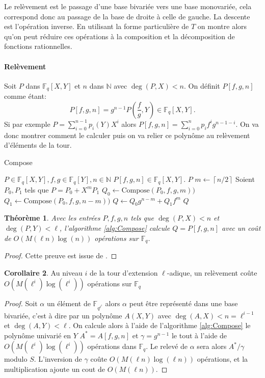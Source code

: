 \documentclass[10pt,a4paper]{book}
\theoremstyle{plain}
\newtheorem{thm}{Théorème}
\theoremstyle{definition}
\theoremstyle{definition}
\newtheorem{cor}[thm]{Corollaire}
\theoremstyle{definition}
\theoremstyle{definition}
\theoremstyle{remark}
\theoremstyle{remark}
\begin{document}
Le relèvement est le passage d'une base bivariée vers une base monovariée, cela correspond donc au passage de la base de droite à celle de gauche. La descente est l'opération inverse. En utilisant la forme particulière de $T$ on montre alors qu'on peut réduire ces opérations à la composition et la décomposition de fonctions rationnelles.

\paragraph{Relèvement}
Soit $P$ dans $\mathbb{F}_q[X,Y]$ et $n$ dans $\mathbb{N}$ avec $\deg(P,X)<n$. On définit $P[f,g,n]$ comme étant:
\[
P[f,g,n]=g^{n-1}P(\frac{f}{g},Y)\in \mathbb{F}_q[X,Y].
\]
Si par exemple $P=\sum_{i=0}^{n-1}p_i(Y)X^i$ alors $P[f,g,n]=\sum_{i=0}^{n}p_if^ig^{n-1-i}$. On va donc montrer comment le calculer puis on va relier ce polynôme au relèvement d'éléments de la tour.

\begin{algorithm}
\caption{\label{alg:Compose}Compose}
\begin{algorithmic}[1]
\REQUIRE $P \in \mathbb{F}_q[X,Y], f,g \in \mathbb{F}_q[Y], n \in \mathbb{N}$
\ENSURE $P[f,g,n] \in \mathbb{F}_q[X,Y]$.
 \RETURN $P$
\ELSE
\STATE $m \gets \left\lceil n/2 \right\rceil   $
\STATE Soient $P_0,P_1$ tels que $P=P_0 + X^{m} P_1$
\STATE $Q_0 \gets \textrm{Compose}(P_0,f,g,m))$
\STATE $Q_1 \gets \textrm{Compose}(P_0,f,g,n-m))$
\STATE $Q \gets Q_0g^{n-m}+Q_1f^m$
\RETURN $Q$ 
\ENDIF
\end{algorithmic}
\end{algorithm}


\begin{thm}\label{thm:compose}
Avec les entrées $P,f,g,n$ tels que $\deg(P,X)<n$ et $\deg(P,Y)<\ell$, l'algorithme \ref{alg:Compose} calcule $Q=P[f,g,n]$ avec un coût de $O(M(\ell n)\log(n))$ opérations sur $\mathbb{F}_q$.
\end{thm}

\begin{proof}
Cette preuve est issue de \cite{DeFeo-Doliskani-Schost13}.
\end{proof}

\begin{cor}
Au niveau $i$ de la tour d'extension $\ell$-adique, un relèvement coûte $O(M(\ell^i)\log(\ell^i))$ opérations sur $\mathbb{F}_q$
\end{cor}

\begin{proof}
Soit $\alpha$ un élément de $\mathbb{F}_{q^{\ell^i}}$ alors $\alpha$ peut être représenté dans une base bivariée, c'est à dire par un polynôme $A(X,Y)$ avec $\deg(A,X)<n=\ell^{i-1}$ et $\deg(A,Y)<\ell$. On calcule alors à l'aide de l'algorithme \ref{alg:Compose} le polynôme univarié en $Y$ $A^*=A[f,g,n]$ et $\gamma = g^{n-1}$ le tout à l'aide de $O(M(\ell^i)\log(\ell^i))$ opérations dans $\mathbb{F}_q$. Le relevé de $\alpha$ sera alors $A^*/\gamma$ modulo $S$. L'inversion de $\gamma$ coûte $O(M(\ell n)\log(\ell n))$ opérations, et la multiplication ajoute un cout de $O(M(\ell n))$.
\end{proof}
\end{document}

